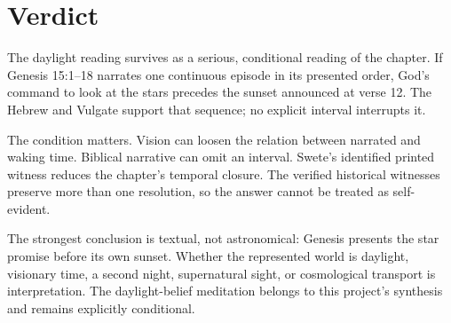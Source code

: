 \section{Verdict}

The daylight reading survives as a serious, conditional reading of the chapter.
If Genesis 15:1--18 narrates one continuous episode in its presented order,
God's command to look at the stars precedes the sunset announced at verse 12.
The Hebrew and Vulgate support that sequence; no explicit interval interrupts
it.

The condition matters. Vision can loosen the relation between narrated and
waking time. Biblical narrative can omit an interval. Swete's identified
printed witness reduces the chapter's temporal closure. The verified
historical witnesses preserve more than one resolution, so the answer cannot
be treated as self-evident.

The strongest conclusion is textual, not astronomical: Genesis presents the
star promise before its own sunset. Whether the represented world is daylight,
visionary time, a second night, supernatural sight, or cosmological transport
is interpretation. The daylight-belief meditation belongs to this project's
synthesis and remains explicitly conditional.

